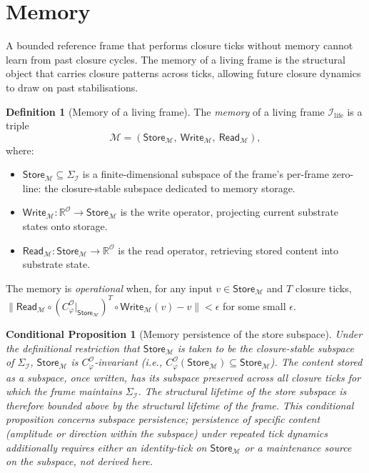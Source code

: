 \documentclass[11pt]{article}
\theoremstyle{plain}
\newtheorem{conditional}[theorem]{Conditional Proposition}
\theoremstyle{definition}
\newtheorem{definition}[theorem]{Definition}
\theoremstyle{remark}
\newcommand{\Ical}{\mathcal{I}}
\newcommand{\Ocal}{\mathcal{O}}
\newcommand{\Mcal}{\mathcal{M}}
\newcommand{\Cph}{C_\varphi}
\newcommand{\Ilife}{\Ical_{\mathrm{life}}}
\begin{document}
\section{Memory}\label{sec:memory}

A bounded reference frame that performs closure ticks without memory cannot learn from past closure cycles. The memory of a living frame is the structural object that carries closure patterns across ticks, allowing future closure dynamics to draw on past stabilisations.

\begin{definition}[Memory of a living frame]\label{def:memory}
The \emph{memory} of a living frame $\Ilife$ is a triple
\[
  \Mcal = (\mathsf{Store}_\Mcal,\ \mathsf{Write}_\Mcal,\ \mathsf{Read}_\Mcal),
\]
where:
\begin{itemize}[leftmargin=2em]
\item $\mathsf{Store}_\Mcal \subseteq \Sigma_\Ical$ is a finite-dimensional subspace of the frame's per-frame zero-line: the closure-stable subspace dedicated to memory storage.
\item $\mathsf{Write}_\Mcal : \mathbb{R}^\Ocal \to \mathsf{Store}_\Mcal$ is the write operator, projecting current substrate states onto storage.
\item $\mathsf{Read}_\Mcal : \mathsf{Store}_\Mcal \to \mathbb{R}^\Ocal$ is the read operator, retrieving stored content into substrate state.
\end{itemize}
The memory is \emph{operational} when, for any input $v \in \mathsf{Store}_\Mcal$ and $T$ closure ticks, $\|\mathsf{Read}_\Mcal \circ (\Cph^\Ocal|_{\mathsf{Store}_\Mcal})^T \circ \mathsf{Write}_\Mcal(v) - v\| < \epsilon$ for some small $\epsilon$.
\end{definition}

\begin{conditional}[Memory persistence of the store subspace]\label{thm:memory-persistence}
Under the definitional restriction that $\mathsf{Store}_\Mcal$ is taken to be the closure-stable subspace of $\Sigma_\Ical$, $\mathsf{Store}_\Mcal$ is $\Cph^\Ocal$-invariant (i.e., $\Cph^\Ocal(\mathsf{Store}_\Mcal) \subseteq \mathsf{Store}_\Mcal$). The content stored \emph{as a subspace}, once written, has its subspace preserved across all closure ticks for which the frame maintains $\Sigma_\Ical$. The structural lifetime of the store subspace is therefore bounded above by the structural lifetime of the frame. This conditional proposition concerns subspace persistence; persistence of specific content (amplitude or direction within the subspace) under repeated tick dynamics additionally requires either an identity-tick on $\mathsf{Store}_\Mcal$ or a maintenance source on the subspace, not derived here.
\end{conditional}
\end{document}
